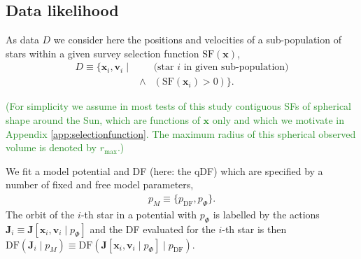 \documentclass[iop,revtex4,numberedappendix,appendixfloats]{emulateapj}
\newcommand{\vect}[1]{\boldsymbol{#1}}
\newcommand{\pmodel}{\ensuremath{p_M}}
\newcommand{\NEW}[1]{\textcolor{ForestGreen}{#1}}
\begin{document}

\subsection{Data likelihood} \label{sec:data_likelihood}

As data $D$ we consider here the positions and velocities of a sub-population of stars within a given survey selection function $\text{SF}(\vect{x})$,
\begin{eqnarray*}
D  \equiv \{ \vect{x}_i,\vect{v}_i \mid && \text{(star $i$ in given sub-population)}\nonumber\\
&\wedge& (\text{SF}(\vect{x}_i) > 0) \}.
\end{eqnarray*}

\NEW{(For simplicity we assume in most tests of this study contiguous SFs of spherical shape around the Sun, which are functions of $\vect{x}$ only and which we motivate in Appendix \ref{app:selectionfunction}. The maximum radius of this spherical observed volume is denoted by $r_\text{max}$.)}

We fit a model potential and DF (here: the qDF) which are specified by a number of fixed and free model parameters,
\begin{eqnarray*}
\pmodel \equiv \{ p_\text{DF} , p_\Phi \}.
\end{eqnarray*}
The orbit of the $i$-th star in a potential with $p_\Phi$ is labelled by the actions $\vect{J}_i \equiv \vect{J}[\vect{x}_i,\vect{v}_i\mid p_{\Phi}]$ and the DF evaluated for the $i$-th star is then $\text{DF}(\vect{J}_i \mid \pmodel) \equiv \text{DF}(\vect{J}[\vect{x}_i,\vect{v}_i\mid p_{\Phi}] \mid p_\text{DF})$.
\end{document}
